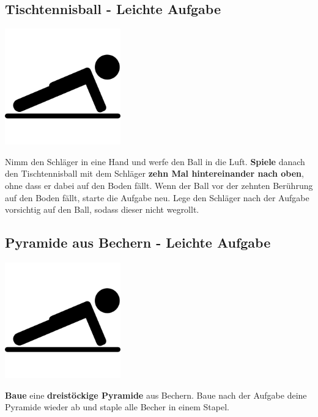 \subsection{Tischtennisball - Leichte Aufgabe}
\vfill
\begin{center}
    \includegraphics[height=5cm]{graphics/push_up.png}
\end{center}
\vfill
Nimm den Schläger in eine Hand und werfe den Ball in die Luft.
\textbf{Spiele} danach den Tischtennisball
mit dem Schläger \textbf{zehn Mal hintereinander nach oben}, ohne dass er dabei
auf den Boden fällt.
Wenn der Ball vor der zehnten Berührung auf den Boden fällt, starte die Aufgabe
neu.
Lege den Schläger nach der Aufgabe vorsichtig auf den Ball, sodass dieser nicht
wegrollt.
\newline
\newpage

\subsection{Pyramide aus Bechern - Leichte Aufgabe}
\vfill
\begin{center}
    \includegraphics[height=5cm]{graphics/push_up.png}
\end{center}
\vfill
\textbf{Baue} eine \textbf{dreistöckige Pyramide} aus Bechern.
Baue nach der Aufgabe deine Pyramide wieder ab und staple alle Becher in einem
Stapel.
\newline
\newpage


